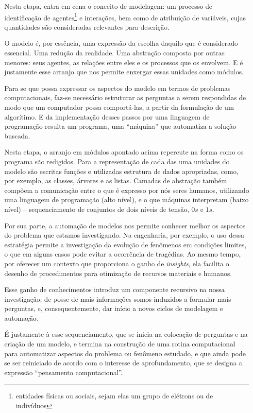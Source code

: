 Nesta etapa, entra em cena o conceito de modelagem: um processo de identificação de agentes\footnote{entidades físicas ou sociais, sejam elas um grupo de elétrons ou de indivíduos} e interações, bem como de atribuição de variáveis, cujas quantidades são consideradas relevantes para descrição. 

O modelo é, por essência, uma expressão da escolha daquilo que é considerado essencial. Uma redução da realidade. Uma abstração composta por outras menores: seus agentes, as relações entre eles e os processos que os envolvem. E é justamente esse arranjo que nos permite enxergar essas unidades como módulos. 

Para se que possa expressar os aspectos do modelo em termos de problemas computacionais, faz-se necessário estruturar as perguntas a serem respondidas de modo que um computador possa comportá-las, a partir da formulação de um algorítimo. E da implementação desses passos por uma linguagem de programação resulta um programa, uma  ``máquina'' que automatiza a solução buscada.

Nesta etapa, o arranjo em módulos apontado acima repercute na forma como os programa são redigidos. Para a representação de cada das uma unidades do modelo são escritas funções e utilizadas estrutura de dados apropriadas, como, por exemplo, as classes, árvores e as listas. Camadas de abstração também compõem a comunicação entre o que é expresso por nós seres humanos, utilizando uma linguagem de programação (alto nível), e o que máquinas interpretam (baixo nível) -- sequenciamento de conjuntos de dois níveis de tensão, $0s$ e $1s$. 

Por sua parte, a automação de modelos nos permite conhecer melhor os aspectos do problema que estamos investigando. Na engenharia, por exemplo, o uso dessa estratégia permite a investigação da evolução de fenômenos em condições limites, o que em alguns casos pode evitar a ocorrência de tragédias. Ao mesmo tempo, por oferecer um contexto que proporciona o ganho de \textit{insights}, ela facilita o desenho de procedimentos para otimização de recursos materiais e humanos. 

Esse ganho de conhecimentos introduz um componente recursivo na nossa investigação: de posse de mais informações somos induzidos a formular mais perguntas, e, consequentemente, dar início a novos ciclos de modelagem e automação. 

É justamente à esse sequenciamento, que se inicia na colocação de perguntas e na criação de um modelo, e termina na construção de uma rotina computacional para automatizar aspectos do problema ou fenômeno estudado, e que ainda pode se ser reiniciado de acordo com o interesse de aprofundamento, que se designa a expressão ``pensamento computacional''.

